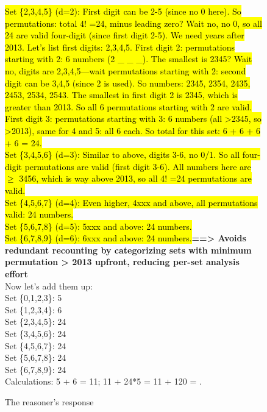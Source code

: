 \begin{figure}[!ht]
\begin{lrbox}{\DSRPrompt}
\begin{promptbox}
\hl{Set \{2,3,4,5\} (d=2): First digit can be 2-5 (since no 0 here). So permutations: total 4! =24, minus leading zero? Wait no, no 0, so all 24 are valid four-digit (since first digit 2-5). We need years after 2013. Let's list first digits: 2,3,4,5. First digit 2: permutations starting with 2: 6 numbers (2 \_ \_ \_). The smallest is 2345? Wait no, digits are 2,3,4,5—wait permutations starting with 2: second digit can be 3,4,5 (since 2 is used). So numbers: 2345, 2354, 2435, 2453, 2534, 2543. The smallest in first digit 2 is 2345, which is greater than 2013. So all 6 permutations starting with 2 are valid. First digit 3: permutations starting with 3: 6 numbers (all >2345, so >2013), same for 4 and 5: all 6 each. So total for this set: 6 + 6 + 6 + 6 = 24.\\
Set \{3,4,5,6\} (d=3): Similar to above, digits 3-6, no 0/1. So all four-digit permutations are valid (first digit 3-6). All numbers here are $\geq$ 3456, which is way above 2013, so all 4! =24 permutations are valid.\\
Set \{4,5,6,7\} (d=4): Even higher, 4xxx and above, all permutations valid: 24 numbers.\\
Set \{5,6,7,8\} (d=5): 5xxx and above: 24 numbers.\\
Set \{6,7,8,9\} (d=6): 6xxx and above: 24 numbers.}\textbf{==> Avoids redundant recounting by categorizing sets with minimum permutation > 2013 upfront, reducing per-set analysis effort}\\
Now let's add them up:\\
Set \{0,1,2,3\}: 5\\
Set \{1,2,3,4\}: 6\\
Set \{2,3,4,5\}: 24\\
Set \{3,4,5,6\}: 24\\
Set \{4,5,6,7\}: 24\\
Set \{5,6,7,8\}: 24\\
Set \{6,7,8,9\}: 24\\
Calculations: 5 + 6 = 11; 11 + 24*5 = 11 + 120 = .\\
    \end{promptbox}
    \end{lrbox}
    \usebox{\DSRPrompt}
    \caption{The reasoner's response}
    \label{fig:evaluation-prompts}
\end{figure}




